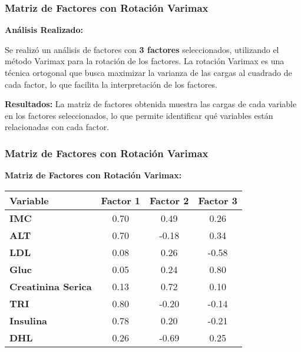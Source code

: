 \documentclass[
	11pt, %
]{beamer}
\begin{document}
\begin{frame}
\frametitle{Matriz de Factores con Rotación Varimax}

\textbf{Análisis Realizado:}

Se realizó un análisis de factores con \textbf{3 factores} seleccionados, utilizando el método Varimax para la rotación de los factores. La rotación Varimax es una técnica ortogonal que busca maximizar la varianza de las cargas al cuadrado de cada factor, lo que facilita la interpretación de los factores.

\vspace{0.4cm}

\textbf{Resultados:} La matriz de factores obtenida muestra las cargas de cada variable en los factores seleccionados, lo que permite identificar qué variables están relacionadas con cada factor.

\end{frame}

\begin{frame}
\frametitle{Matriz de Factores con Rotación Varimax}

\textbf{Matriz de Factores con Rotación Varimax:}

\begin{table}[ht]
\centering
\begin{tabular}{|l|c|c|c|}
\hline
\textbf{Variable} & \textbf{Factor 1} & \textbf{Factor 2} & \textbf{Factor 3} \\
\hline
\textbf{IMC} & 0.70 & 0.49 & 0.26 \\
\hline
\textbf{ALT} & 0.70 & -0.18 & 0.34 \\
\hline
\textbf{LDL} & 0.08 & 0.26 & -0.58 \\
\hline
\textbf{Gluc} & 0.05 & 0.24 & 0.80 \\
\hline
\textbf{Creatinina Serica} & 0.13 & 0.72 & 0.10 \\
\hline
\textbf{TRI} & 0.80 & -0.20 & -0.14 \\
\hline
\textbf{Insulina} & 0.78 & 0.20 & -0.21 \\
\hline
\textbf{DHL} & 0.26 & -0.69 & 0.25 \\
\hline
\end{tabular}
\end{table}

\end{frame}
\end{document}
